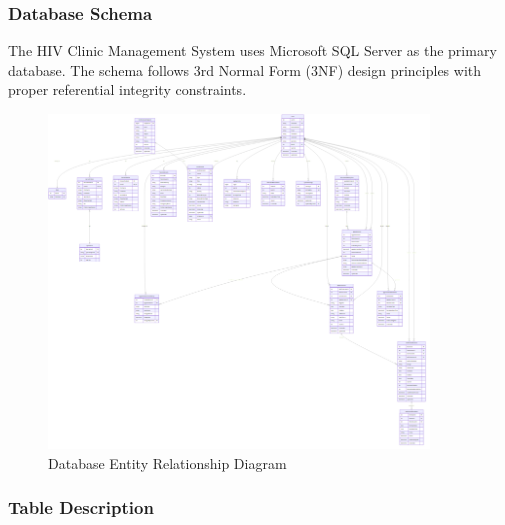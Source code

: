 \documentclass[12pt,a4paper]{article}
\begin{document}
\subsubsection{Database Schema}

The HIV Clinic Management System uses Microsoft SQL Server as the primary database. The schema follows 3rd Normal Form (3NF) design principles with proper referential integrity constraints.

\begin{figure}[H]
\centering
\includegraphics[width=0.9\textwidth]{diagrams/database_schema_erd.png}
\caption{Database Entity Relationship Diagram}
\label{fig:database-schema}
\end{figure}

\subsubsection{Table Description}
\end{document}
